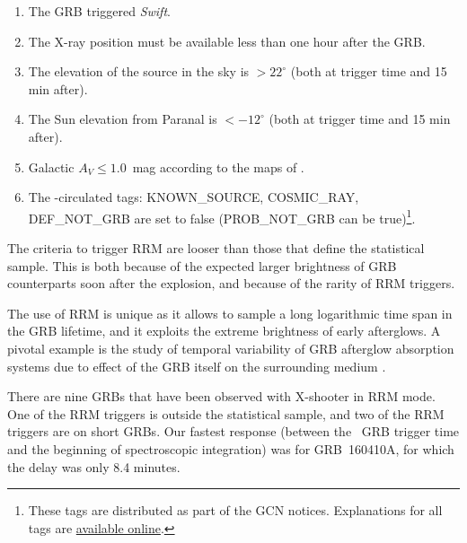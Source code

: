 \documentclass[longauth]{aa}    %
\begin{document}
\begin{enumerate}
	\item The GRB triggered \textit{Swift}.
	\item The X-ray position must be available less than one hour after the GRB.
	\item The elevation of the source in the sky is $> 22^\circ$ (both at trigger time and 15 min after).
	\item The Sun elevation from Paranal is $< -12^\circ$ (both at trigger time and 15 min after).
	\item Galactic $A_V \leq 1.0$~mag according to the maps of \citet{Schlegel1998}.
	\item The \swift-circulated tags: KNOWN\_SOURCE, COSMIC\_RAY, DEF\_NOT\_GRB are set to false (PROB\_NOT\_GRB can be true)\footnote{These tags are distributed as part of the GCN notices. Explanations for all tags are \href{https://gcn.gsfc.nasa.gov/sock_pkt_def_doc.html}{available online}.}.
\end{enumerate}

The criteria to trigger RRM are looser than those that define the statistical
sample. This is both because of the expected larger brightness of GRB
counterparts soon after the explosion, and because of the rarity of RRM
triggers.

The use of RRM is unique as it allows to sample a long logarithmic time span in
the GRB lifetime, and it exploits the extreme brightness of early afterglows. A
pivotal example is the study of temporal variability of GRB afterglow absorption
systems due to effect of the GRB itself on the surrounding medium \citep[e.g.
see][]{Dessauges-Zavadsky2006, Vreeswijk2007, DElia2009, Vreeswijk2013}.

There are nine GRBs that have been observed with X-shooter in RRM mode. One of
the RRM triggers is outside the statistical sample, and two of the RRM triggers
are on short GRBs. Our fastest response (between the \swift~GRB trigger time and
the beginning of spectroscopic integration) was for GRB~160410A, for which the
delay was only 8.4 minutes.
\end{document}
